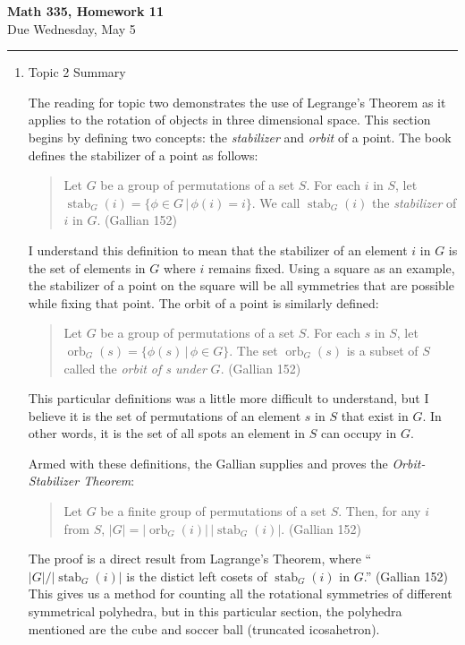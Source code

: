 \documentclass[11pt,twoside]{article}
\begin{document}
\begin{center}
{\bf \Large Math 335, Homework 11}\\
\vspace{0.1in}
{\Large Due Wednesday, May 5}
\vspace{0.1cm}
\end{center}

\hrule

\vspace{.2in}

\begin{enumerate}

\item Topic 2 Summary

The reading for topic two demonstrates the use of Legrange's Theorem as it applies to the rotation of objects in three dimensional space.  This section begins by defining two concepts: the \emph{stabilizer} and \emph{orbit} of a point.  The book defines the stabilizer of a point as follows:
\begin{quote}
Let $G$ be a group of permutations of a set $S$.  For each $i$ in $S$, let $\operatorname{stab}_G(i) = \{ \phi \in G\, | \, \phi(i) = i \}$.  We call $\operatorname{stab}_G(i)$ the \emph{stabilizer} of $i$ in $G$. (Gallian 152)
\end{quote}
I understand this definition to mean that the stabilizer of an element $i$ in $G$ is the set of elements in $G$ where $i$ remains fixed.  Using a square as an example, the stabilizer of a point on the square will be all symmetries that are possible while fixing that point.  The orbit of a point is similarly defined:
\begin{quote}
Let $G$ be a group of permutations of a set $S$.  For each $s$ in $S$, let $\operatorname{orb}_G(s) = \{ \phi(s)\, | \, \phi \in G \}$.  The set $\operatorname{orb}_G(s)$ is a subset of $S$ called the \emph{orbit of s under} $G$. (Gallian 152)
\end{quote}
This particular definitions was a little more difficult to understand, but I believe it is the set of permutations of an element $s$ in $S$ that exist in $G$.  In other words, it is the set of all spots an element in $S$ can occupy in $G$.

Armed with these definitions, the Gallian supplies and proves the \emph{Orbit-Stabilizer Theorem}:
\begin{quote}
Let $G$ be a finite group of permutations of a set $S$.  Then, for any $i$ from $S$, $|G| = |\operatorname{orb}_G(i)|\,|\operatorname{stab}_G(i)|$. (Gallian 152)
\end{quote}
The proof is a direct result from Lagrange's Theorem, where ``$|G|/|\operatorname{stab}_G(i)|$ is the distict left cosets of $\operatorname{stab}_G(i)$ in $G$.'' (Gallian 152)  This gives us a method for counting all the rotational symmetries of different symmetrical polyhedra, but in this particular section, the polyhedra mentioned are the cube and soccer ball (truncated icosahetron).


\end{enumerate}
\end{document}
